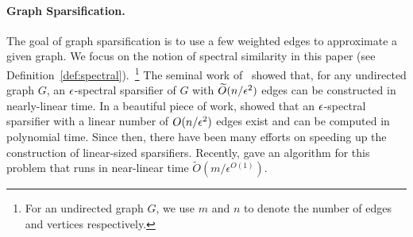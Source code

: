 \paragraph{Graph Sparsification.}
The goal of graph sparsification is to use a few weighted edges to approximate a given graph. We focus on the notion of spectral similarity in this paper (see Definition~\ref{def:spectral}).~\footnote{For an undirected graph $G$, we use $m$ and $n$ to denote the number of edges and vertices respectively.} The seminal work of~\cite{SpielmanT11} showed that, for any undirected graph $G$, an $\epsilon$-spectral sparsifier of $G$ with $\widetilde O(n / \epsilon^2)$ edges can be constructed in nearly-linear time. In a beautiful piece of work, \cite{BatsonSS12} showed that an $\epsilon$-spectral sparsifier with a linear number of $O(n/\epsilon^2)$ edges exist and can be computed in polynomial time.
Since then, there have been many efforts \citep{AllenLO15, LeeS15, LeeS17} on speeding up the construction of linear-sized sparsifiers. Recently, \cite{LeeS17} gave an algorithm for this problem that runs in near-linear time $\tilde{O}(m/\epsilon^{O(1)})$.



